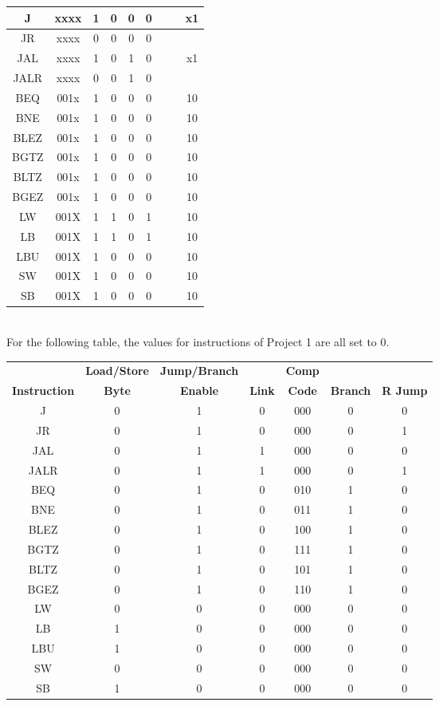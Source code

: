 \documentclass{article}
\begin{document}
\begin{center}
\begin{tabular}{|c|c|c|c|c|c|c|c|c|}
J & xxxx & 1 & 0 & 0 & 0 &&&x1 \\ \hline
JR & xxxx & 0 & 0 & 0 & 0 &&& \\ \hline
JAL & xxxx & 1 & 0 & 1 & 0 &&&x1 \\ \hline
JALR & xxxx & 0 & 0 & 1 & 0 &&& \\ \hline
BEQ & 001x & 1 & 0 & 0 & 0 &&&10 \\ \hline
BNE & 001x & 1 & 0 & 0 & 0 &&&10 \\ \hline
BLEZ& 001x & 1 & 0 & 0 & 0 &&&10 \\ \hline
BGTZ& 001x & 1 & 0 & 0 & 0 &&&10 \\ \hline
BLTZ& 001x & 1 & 0 & 0 & 0 &&&10 \\ \hline
BGEZ& 001x & 1 & 0 & 0 & 0 &&&10 \\ \hline
LW & 001X & 1 & 1 & 0 & 1 &&& 10 \\ \hline
LB & 001X & 1 & 1 & 0 & 1 &&& 10 \\ \hline
LBU & 001X & 1 & 0 & 0 & 0 &&& 10 \\ \hline
SW & 001X & 1 & 0 & 0 & 0 &&& 10 \\ \hline
SB & 001X & 1 & 0 & 0 & 0 &&& 10 \\ \hline
\end{tabular} \vspace{2mm}\\
For the following table, the values for instructions of Project 1 are all set to 0.
\begin{tabular}{|c|c|c|c|c|c|c|} \hline
& \textbf{Load/Store} & \textbf{Jump/Branch} && \textbf{Comp} & & \\ 
\textbf{Instruction} & \textbf{Byte} & \textbf{Enable} & \textbf{Link} & \textbf{Code} & \textbf{Branch} & \textbf{R Jump} \\ \hline
J &0& 1 & 0 & 000 & 0 & 0 \\ \hline
JR &0& 1 & 0 & 000 & 0 & 1 \\ \hline
JAL &0& 1 & 1 & 000 & 0 & 0 \\ \hline
JALR &0& 1 & 1 & 000 & 0 & 1 \\ \hline
BEQ &0& 1 & 0 & 010 & 1 & 0 \\ \hline
BNE &0& 1 & 0 & 011 & 1 & 0 \\ \hline
BLEZ &0& 1 & 0 & 100 & 1 & 0 \\ \hline
BGTZ &0& 1 & 0 & 111 & 1 & 0 \\ \hline
BLTZ &0& 1 & 0 & 101 & 1 & 0 \\ \hline
BGEZ &0& 1 & 0 & 110 & 1 & 0 \\ \hline
LW & 0 & 0 & 0  &000& 0&0 \\ \hline
LB & 1 & 0 & 0  &000& 0&0 \\ \hline
LBU & 1 & 0 & 0  &000& 0&0 \\ \hline
SW & 0 & 0 & 0  &000& 0&0 \\ \hline
SB & 1 & 0 & 0 &000& 0&0 \\ \hline
\end{tabular}
\end{center}
\end{document}
